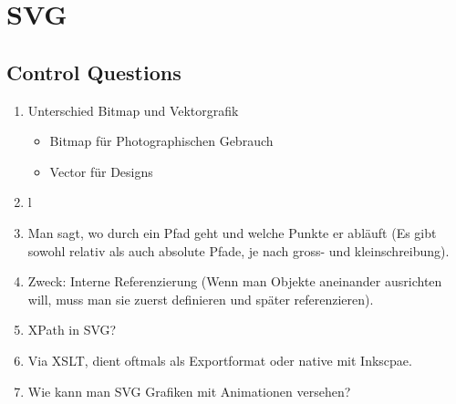 \chapter{SVG}
\section{Control Questions}
\begin{enumerate}
\item Unterschied Bitmap und Vektorgrafik
\begin{itemize}
\item Bitmap für Photographischen Gebrauch
\item Vector für Designs
\end{itemize}

\item l

\item Man sagt, wo durch ein Pfad geht und welche Punkte er abläuft (Es gibt sowohl relativ als auch absolute Pfade, je nach gross- und kleinschreibung).

\item Zweck: Interne Referenzierung (Wenn man Objekte aneinander ausrichten will, muss man sie zuerst definieren und später referenzieren).

\item XPath in SVG?

\item Via XSLT, dient oftmals als Exportformat oder native mit Inkscpae.

\item Wie kann man SVG Grafiken mit Animationen versehen?

\end{enumerate}



